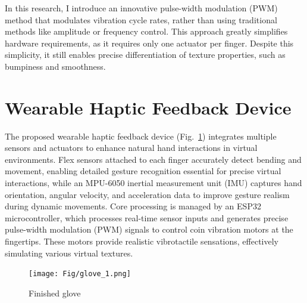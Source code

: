 \documentclass[a4paper,twocolumn]{article}
\begin{document}
In this research, I introduce an innovative pulse-width modulation (PWM) method that modulates vibration cycle rates, rather than using traditional methods like amplitude or frequency control. This approach greatly simplifies hardware requirements, as it requires only one actuator per finger. Despite this simplicity, it still enables precise differentiation of texture properties, such as bumpiness and smoothness.



\section{Wearable Haptic Feedback Device}
The proposed wearable haptic feedback device (Fig.~\ref{fig:finalglove}) integrates multiple sensors and actuators to enhance natural hand interactions in virtual environments. Flex sensors attached to each finger accurately detect bending and movement, enabling detailed gesture recognition essential for precise virtual interactions, while an MPU-6050 inertial measurement unit (IMU) captures hand orientation, angular velocity, and acceleration data to improve gesture realism during dynamic movements. Core processing is managed by an ESP32 microcontroller, which processes real-time sensor inputs and generates precise pulse-width modulation (PWM) signals to control coin vibration motors at the fingertips. These motors provide realistic vibrotactile sensations, effectively simulating various virtual textures. 

\begin{figure}[H]
  \centering
	\texttt{[image: Fig/glove\_1.png]}%
	\caption{Finished glove}\label{fig:finalglove}%
\end{figure}
\end{document}

